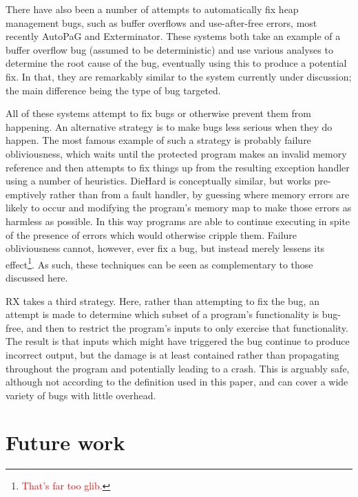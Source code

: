 \documentclass[10pt,twocolumn,preprint,natbib,authoryear]{sigplanconf}
\newcommand{\editorial}[1]{\textcolor{red}{\footnote{\textcolor{red}{#1}}}}
\begin{document}
There have also been a number of attempts to automatically fix heap
management bugs, such as buffer overflows and use-after-free errors,
most recently AutoPaG\cite{Lin2007} and Exterminator\cite{Novark2007}.
These systems both take an example of a buffer overflow bug (assumed
to be deterministic) and use various analyses to determine the root
cause of the bug, eventually using this to produce a potential fix.
In that, they are remarkably similar to the system currently under
discussion; the main difference being the type of bug targeted.

All of these systems attempt to fix bugs or otherwise prevent them
from happening.  An alternative strategy is to make bugs less serious
when they do happen.  The most famous example of such a strategy is
probably failure obliviousness\cite{Rinard2004}, which waits until the
protected program makes an invalid memory reference and then attempts
to fix things up from the resulting exception handler using a number
of heuristics.  DieHard\cite{Berger2006} is conceptually similar, but
works pre-emptively rather than from a fault handler, by guessing
where memory errors are likely to occur and modifying the program's
memory map to make those errors as harmless as possible.  In this way
programs are able to continue executing in spite of the presence of
errors which would otherwise cripple them.  Failure obliviousness
cannot, however, ever fix a bug, but instead merely lessens its
effect\editorial{That's far too glib.}.  As such, these techniques can
be seen as complementary to those discussed here.

RX\cite{Qin2007} takes a third strategy.  Here, rather than
attempting to fix the bug, an attempt is made to determine which
subset of a program's functionality is bug-free, and then to restrict
the program's inputs to only exercise that functionality.  The result
is that inputs which might have triggered the bug continue to produce
incorrect output, but the damage is at least contained rather than
propagating throughout the program and potentially leading to a crash.
This is arguably safe, although not according to the definition used
in this paper, and can cover a wide variety of bugs with little
overhead.

\section{Future work}
\end{document}
